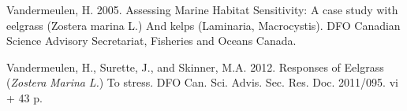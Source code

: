 \documentclass[12pt]{article}\usepackage[]{graphicx}\usepackage[]{color}
\begin{document}
\begin{CSLReferences}{1}{0}
%
Vandermeulen, H. 2005. Assessing {Marine Habitat Sensitivity}: {A} case study with eelgrass ({Zostera} marina {L}.) And kelps ({Laminaria}, {Macrocystis}). {DFO Canadian Science Advisory Secretariat, Fisheries and Oceans Canada}.

%
Vandermeulen, H., Surette, J., and Skinner, M.A. 2012. Responses of {Eelgrass} ({\emph{Zostera}}{ \emph{Marina} }{\emph{L}}{\emph{.}}) To stress. DFO Can. Sci. Advis. Sec. Res. Doc. 2011/095. vi + 43 p.

\end{CSLReferences}
\end{document}
